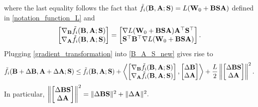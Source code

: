 \documentclass{article} %
\theoremstyle{plain}
\theoremstyle{definition}
\begin{document}
where the last equality follows the fact that \(\tilde{f}_i({\bf B},{\bf A}; {\bf S}) = L({\bf W}_{0} + {\bf B}\bf S{\bf A}) \) defined in \eqref{notation_function_L} and
\[
\begin{bmatrix}
      \nabla_{\bf B} \tilde{f}_i({\bf B},{\bf A}; {\bf S}) \\
        \nabla_{\bf A} \tilde{f}_i({\bf B},{\bf A}; {\bf S})
    \end{bmatrix}
=
\begin{bmatrix}
      \nabla L({\bf W}_{0} + {\bf B} {\bf S} {\bf A}){\bf A}^{\top} {\bf S}^{\top} \\
       {\bf S}^{\top} {\bf B}^{\top} \nabla L({\bf W}_{0} + {\bf B} {\bf S} {\bf A})
    \end{bmatrix}.
\]
Plugging \eqref{gradient_transformation} into \eqref{B_A_S_new} gives rise to
\begin{align}\label{later_derivation_S}
    \tilde{f}_{i} ({\bf B} + \Delta {\bf B} , {\bf A}+ \Delta{\bf A}; {\bf S}) \leq \tilde{f}_{i} ({\bf B},{\bf A}; {\bf S}) + 
    \left \langle \begin{bmatrix}
      \nabla_{\bf B} \tilde{f}_i({\bf B},{\bf A}; {\bf S})\\
        \nabla_{\bf A} \tilde{f}_i({\bf B},{\bf A}; {\bf S})
    \end{bmatrix}, 
    \begin{bmatrix}
        {\Delta {\bf B}} \\
         \Delta {\bf A}  
    \end{bmatrix}
    \right \rangle + \frac{L}{2} \left \| \begin{bmatrix}
       {\Delta {\bf B}} {\bf S}\\
        \Delta {\bf A}
    \end{bmatrix} \right \|^2.  
\end{align}
In particular, \(\left \| \begin{bmatrix}
       \Delta {\bf B} {\bf S}\nonumber\\
        \Delta {\bf A}
    \end{bmatrix} \right \|^2 = \|{\Delta {\bf B}} {\bf S}\|^2 + \|\Delta {\bf A}\|^2. \) 
\end{document}
